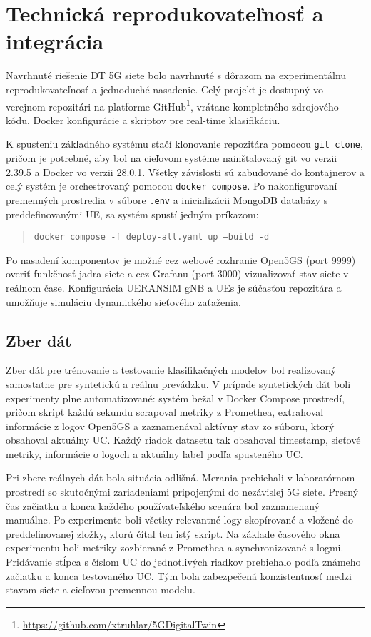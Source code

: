 \section{Technická reprodukovateľnosť a integrácia}

Navrhnuté riešenie DT 5G siete bolo navrhnuté s dôrazom na experimentálnu reprodukovateľnosť a jednoduché nasadenie. Celý projekt je dostupný vo verejnom repozitári na platforme GitHub\footnote{\url{https://github.com/xtruhlar/5GDigitalTwin}}, vrátane kompletného zdrojového kódu, Docker konfigurácie a skriptov pre real-time klasifikáciu.

K spusteniu základného systému stačí klonovanie repozitára pomocou \texttt{git clone}, pričom je potrebné, aby bol na cieľovom systéme nainštalovaný  git vo verzii 2.39.5 a  Docker vo verzii 28.0.1. Všetky závislosti sú zabudované do kontajnerov a celý systém je orchestrovaný pomocou \texttt{docker compose}. Po nakonfigurovaní premenných prostredia v súbore \texttt{.env} a inicializácii MongoDB databázy s preddefinovanými UE, sa systém spustí jedným príkazom:

\begin{quote} \texttt{docker compose -f deploy-all.yaml up --build -d} \end{quote}

Po nasadení komponentov je možné cez webové rozhranie Open5GS (port 9999) overiť funkčnosť jadra siete a cez Grafanu (port 3000) vizualizovať stav siete v reálnom čase. Konfigurácia UERANSIM gNB a UEs je súčasťou repozitára a umožňuje simuláciu dynamického sieťového zaťaženia.

\subsection*{Zber dát}

Zber dát pre trénovanie a testovanie klasifikačných modelov bol realizovaný samostatne pre syntetickú a reálnu prevádzku. V prípade syntetických dát boli experimenty plne automatizované: systém bežal v Docker Compose prostredí, pričom skript každú sekundu scrapoval metriky z Promethea, extrahoval informácie z logov Open5GS a zaznamenával aktívny stav zo súboru, ktorý obsahoval aktuálny UC. Každý riadok datasetu tak obsahoval timestamp, sieťové metriky, informácie o logoch a aktuálny label podľa spusteného UC.

Pri zbere reálnych dát bola situácia odlišná. Merania prebiehali v laboratórnom prostredí so skutočnými zariadeniami pripojenými do nezávislej 5G siete. Presný čas začiatku a konca každého používateľského scenára bol zaznamenaný manuálne. Po experimente boli všetky relevantné logy skopírované a vložené do preddefinovanej zložky, ktorú čítal ten istý skript. Na základe časového okna experimentu boli metriky zozbierané z Promethea a synchronizované s logmi. Pridávanie stĺpca s číslom UC do jednotlivých riadkov prebiehalo podľa známeho začiatku a konca testovaného UC. Tým bola zabezpečená konzistentnosť medzi stavom siete a cieľovou premennou modelu.

